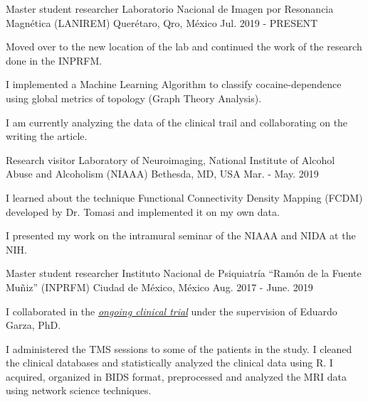 \vspace{-3.2mm}
\vspace{-1.5mm}
\begin{cventries}
    \cventry
        {Master student researcher}
        {Laboratorio Nacional de Imagen por Resonancia Magnética (LANIREM)}
        {Querétaro, Qro, México}
        {Jul. 2019 - PRESENT}
        {
            \begin{cvitems}
                \item {Moved over to the new location of the lab and continued the work of the research done in the INPRFM.}
                \item {I implemented a Machine Learning Algorithm to classify cocaine-dependence using global metrics of topology (Graph Theory Analysis).}
                \item {I am currently analyzing the data of the clinical trail and collaborating on the writing the article.}
            \end{cvitems}
        }
    \cventry
        {Research visitor}
        {Laboratory of Neuroimaging, National Institute of Alcohol Abuse and
        Alcoholism (NIAAA)}
        {Bethesda, MD, USA}
        {Mar. - May. 2019}
        {
            \begin{cvitems}
                \item {I learned about the technique Functional Connectivity Density Mapping (FCDM) developed by Dr. Tomasi and implemented it on my own data.}
                \item {I presented my work on the intramural seminar of the NIAAA and NIDA at the NIH.}
            \end{cvitems}
        }
    \cventry
        {Master student researcher}
        {Instituto Nacional de Psiquiatría ``Ramón de la Fuente Muñiz''
        (INPRFM)}
        {Ciudad de México, México}
        {Aug. 2017 - June. 2019}
        {
            \begin{cvitems}
                \item {I collaborated in the \href{https://clinicaltrials.gov/ct2/show/study/NCT02986438?term=Jorge+Gonzalez-Olvera&cntry=MX&rank=2} {\textit{ongoing clinical trial}} under the supervision of Eduardo Garza, PhD.}
                \item {I administered the TMS sessions to some of the patients in the study. I cleaned the clinical databases and statistically analyzed the clinical data using R. I acquired, organized in BIDS format, preprocessed and analyzed the MRI data using network science techniques.}

\end{cvitems}}
\end{cventries}
